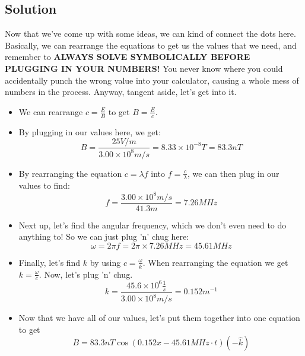 \documentclass[12pt]{article}
\begin{document}
\subsection*{Solution}
Now that we've come up with some ideas, we can kind of connect the dots here. Basically, we can rearrange the equations to get us the values that we need, and remember to \textbf{ALWAYS SOLVE SYMBOLICALLY BEFORE PLUGGING IN YOUR NUMBERS!} You never know where you could accidentally punch the wrong value into your calculator, causing a whole mess of numbers in the process. Anyway, tangent aside, let's get into it.
\begin{itemize}
    \item We can rearrange \(c = \frac{E}{B}\) to get \(B = \frac{E}{c}\).
    \item By plugging in our values here, we get: \[B = \frac{25V/m}{3.00\times10^{8}m/s} = 8.33\times 10^{-8}T = 83.3nT\]
    \item By rearranging the equation $c = \lambda f$ into $f = \frac{c}{\lambda}$, we can then plug in our values to find: \[f = \frac{3.00\times 10^{8}m/s}{41.3m} = 7.26MHz\]
    \item Next up, let's find the angular frequency, which we don't even need to do anything to! So we can just plug 'n' chug here: \[\omega = 2\pi f = 2\pi \times 7.26MHz = 45.61MHz\]
    \item Finally, let's find $k$ by using $c = \frac{\omega}{k}$. When rearranging the equation we get \(k = \frac{\omega}{c}\). Now, let's plug 'n' chug. \[k = \frac{45.6 \times 10^{6}\frac{1}{s}}{3.00 \times 10^{8}m/s} = 0.152m^{-1}\]
    \item Now that we have all of our values, let's put them together into one equation to get \[B = 83.3nT \cos{(0.152x - 45.61MHz \cdot t)}(-\hat{k})\]
\end{itemize}
\end{document}
